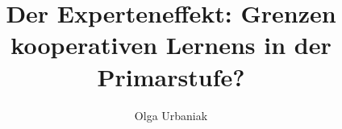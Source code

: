 \title{Der Experteneffekt: Grenzen kooperativen Lernens in der Primarstufe?} %
\author{Olga Urbaniak} %
